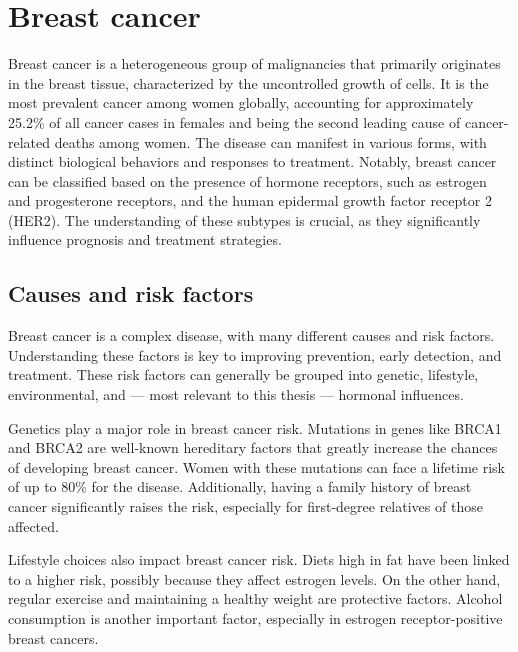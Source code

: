 \section{Breast cancer}
Breast cancer is a heterogeneous group of malignancies that primarily originates
in the breast tissue, characterized by the uncontrolled growth of cells. It is
the most prevalent cancer among women globally, accounting for approximately
25.2\% of all cancer cases in females and being the second leading cause of
cancer-related deaths among women\supercite{pace_breast_2016}. The disease can
manifest in various forms, with distinct biological behaviors and responses to
treatment. Notably, breast cancer can be classified based on the presence of
hormone receptors, such as estrogen and progesterone receptors, and the human
epidermal growth factor receptor 2 (HER2)\supercite{eccles_critical_2013}. The
understanding of these subtypes is crucial, as they significantly influence
prognosis and treatment strategies.

\subsection{Causes and risk factors}

Breast cancer is a complex disease, with many different causes and risk factors.
Understanding these factors is key to improving prevention, early detection, and
treatment. These risk factors can generally be grouped into genetic, lifestyle,
environmental, and — most relevant to this thesis — hormonal influences.

Genetics play a major role in breast cancer risk. Mutations in genes like BRCA1
and BRCA2 are well-known hereditary factors that greatly increase the chances of
developing breast cancer. Women with these mutations can face a lifetime risk of
up to 80\% for the disease\supercite{jian_clinical_2017}. Additionally, having a
family history of breast cancer significantly raises the risk, especially for
first-degree relatives of those affected\supercite{schairer_risk_2013}.

Lifestyle choices also impact breast cancer risk. Diets high in fat have been
linked to a higher risk, possibly because they affect estrogen
levels\supercite{turner_meta-analysis_2011}. On the other hand, regular exercise
and maintaining a healthy weight are protective
factors\supercite{claudia_admoun_etiology_2022}. Alcohol consumption is another
important factor, especially in estrogen receptor-positive breast
cancers\supercite{bao_association_2011}.

